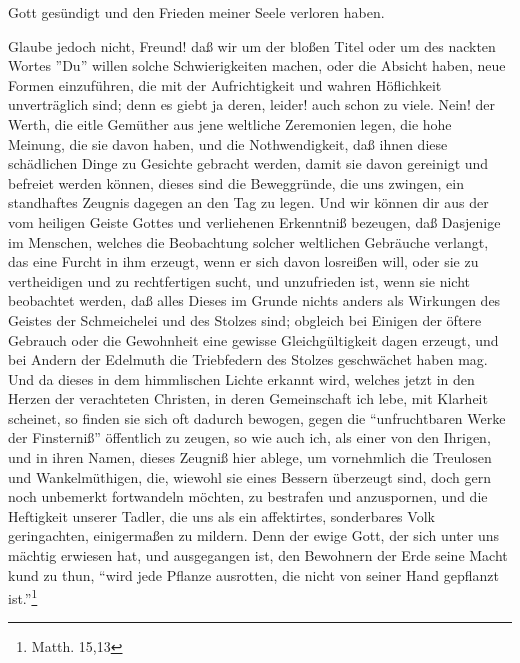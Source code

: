 Gott gesündigt und den Frieden meiner Seele verloren haben.

Glaube jedoch nicht, Freund! daß wir um der bloßen Titel oder um des nackten Wortes ''Du'' willen solche Schwierigkeiten machen, oder die Absicht haben, neue Formen einzuführen, die mit der Aufrichtigkeit und wahren Höflichkeit unverträglich sind; denn es giebt ja deren, leider! auch schon zu viele. Nein! der Werth, die eitle Gemüther aus jene weltliche Zeremonien legen, die hohe Meinung, die sie davon haben, und die Nothwendigkeit, daß ihnen diese schädlichen Dinge zu Gesichte gebracht werden, damit sie davon gereinigt und befreiet werden  können, dieses sind die Beweggründe, die uns zwingen, ein standhaftes Zeugnis dagegen an den Tag zu legen. Und wir können dir aus der vom heiligen Geiste Gottes und verliehenen Erkenntniß bezeugen, daß Dasjenige im Menschen, welches die Beobachtung solcher weltlichen Gebräuche verlangt, das eine Furcht in ihm erzeugt, wenn er sich davon losreißen will, oder sie zu vertheidigen und zu rechtfertigen sucht, und unzufrieden ist, wenn sie nicht beobachtet werden, daß alles Dieses im Grunde nichts anders als Wirkungen des Geistes der Schmeichelei und des Stolzes sind; obgleich bei Einigen der öftere Gebrauch oder die Gewohnheit eine gewisse Gleichgültigkeit dagen erzeugt, und bei Andern der Edelmuth die Triebfedern des Stolzes geschwächet haben mag. Und da dieses in dem himmlischen Lichte erkannt wird, welches jetzt in den Herzen der verachteten Christen, in deren Gemeinschaft ich lebe, mit Klarheit scheinet, so finden sie sich oft dadurch bewogen, gegen die "`unfruchtbaren Werke der Finsterniß"' öffentlich zu zeugen, so wie auch ich, als einer von den Ihrigen, und in ihren Namen, dieses Zeugniß hier ablege, um vornehmlich die Treulosen und Wankelmüthigen, die, wiewohl sie eines Bessern überzeugt sind, doch gern noch unbemerkt fortwandeln möchten, zu bestrafen und anzuspornen, und die Heftigkeit unserer Tadler, die uns als ein affektirtes, sonderbares Volk geringachten, einigermaßen zu mildern. Denn der ewige Gott, der sich unter uns mächtig erwiesen hat, und ausgegangen ist, den Bewohnern der Erde seine Macht kund zu thun, "`wird jede Pflanze ausrotten, die nicht von seiner Hand gepflanzt ist."'\footnote{Matth. 15,13}


